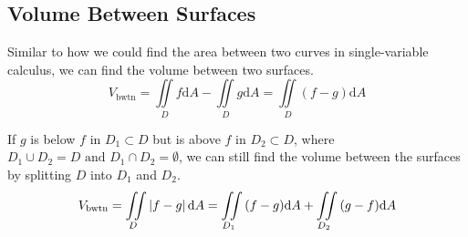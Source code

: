 \subsection{Volume Between Surfaces}
\noindent
Similar to how we could find the area between two curves in single-variable calculus, we can find the volume between two surfaces.
\begin{equation*}
	V_{\text{bwtn}} = \iint\limits_{D}{f\mathrm{d}A} - \iint\limits_{D}{g\mathrm{d}A} = \iint\limits_{D}{(f-g)\mathrm{d}A}
\end{equation*}

\noindent
If $g$ is below $f$ in $D_1 \subset D$ but is above $f$ in $D_2 \subset D$, where $D_1 \cup D_2 = D \text{ and } D_1 \cap D_2 = \emptyset$, we can still find the volume between the surfaces by splitting $D$ into $D_1$ and $D_2$.
\begin{equation*}
	V_{\text{bwtn}} = \iint\limits_{D}{\left|f-g\right|\mathrm{d}A} = \iint\limits_{D_1}{(f-g)\mathrm{d}A} + \iint\limits_{D_2}{(g-f)\mathrm{d}A}
\end{equation*}